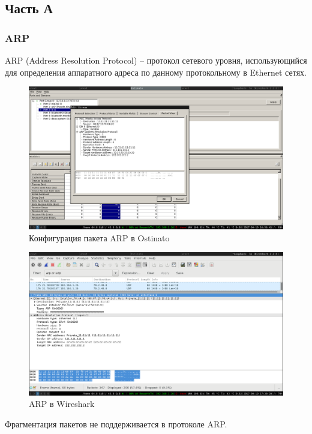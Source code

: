 \documentclass[12pt, a4paper] {ncc}
\begin{document}
\subsection*{Часть А}
\subsubsection*{ARP}
	ARP (Address Resolution Protocol) -- протокол сетевого уровня, использующийся для определения аппаратного адреса 
по данному протокольному в Ethernet сетях. 

	\begin{figure}[h!]
		\includegraphics[scale=0.5]{ARPStream_without_frag.png}
		\caption{Конфигурация пакета ARP в Ostinato}
		\center
	\end{figure}

	\begin{figure}[h!]
		\includegraphics[scale=0.4]{./CapturedARP.png}
		\caption{ARP в Wireshark}
		\center
	\end{figure}

	Фрагментация пакетов не поддерживается в протоколе ARP.
\end{document}
